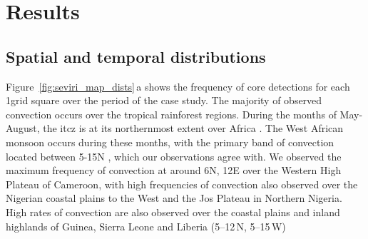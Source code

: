 \section{Results}

\subsection{Spatial and temporal distributions}

Figure~\ref{fig:seviri_map_dists}\,a shows the frequency of core detections for each 1\textdegree grid square over the period of the case study. 
The majority of observed convection occurs over the tropical rainforest regions. 
During the months of May-August, the \acrfull{itcz} is at its northernmost extent over Africa \citep{nicholson_itcz_2018}. 
The West African monsoon occurs during these months, with the primary band of convection located between 5-15\textdegree N \citep{nicholson_revised_2009}, which our observations agree with. 
We observed the maximum frequency of convection at around 6\textdegree N, 12\textdegree E over the Western High Plateau of Cameroon, with high frequencies of convection also observed over the Nigerian coastal plains to the West and the Jos Plateau in Northern Nigeria. 
High rates of convection are also observed over the coastal plains and inland highlands of Guinea, Sierra Leone and Liberia (5--12\,\textdegree N, 5--15\,\textdegree W)


